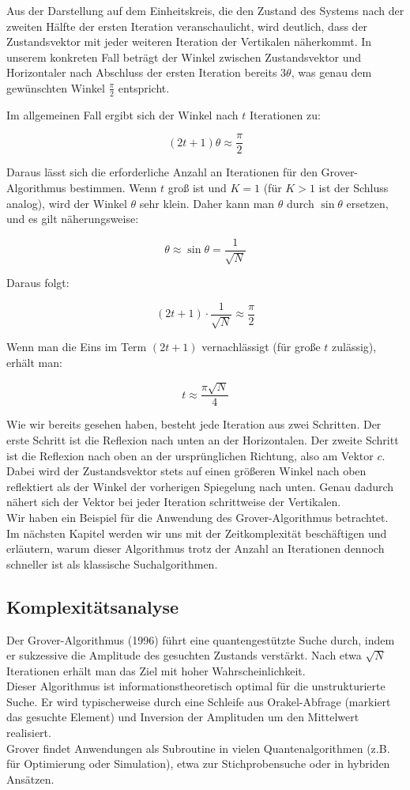 Aus der Darstellung auf dem Einheitskreis, die den Zustand des Systems nach der zweiten Hälfte der ersten Iteration veranschaulicht, wird deutlich, dass der Zustandsvektor mit jeder weiteren Iteration der Vertikalen näherkommt. In unserem konkreten Fall beträgt der Winkel zwischen Zustandsvektor und Horizontaler nach Abschluss der ersten Iteration bereits $3\theta$, was genau dem gewünschten Winkel $\frac{\pi}{2}$ entspricht.

Im allgemeinen Fall ergibt sich der Winkel nach $t$ Iterationen zu:

$$
(2t + 1)\theta \approx \frac{\pi}{2}
$$

Daraus lässt sich die erforderliche Anzahl an Iterationen für den Grover-Algorithmus bestimmen. Wenn $t$ groß ist und $K = 1$ (für $K > 1$ ist der Schluss analog), wird der Winkel $\theta$ sehr klein. Daher kann man $\theta$ durch $\sin{\theta}$ ersetzen, und es gilt näherungsweise:

$$
\theta \approx \sin{\theta} = \frac{1}{\sqrt{N}}
$$

Daraus folgt:

$$
(2t + 1) \cdot \frac{1}{\sqrt{N}} \approx \frac{\pi}{2}
$$

Wenn man die Eins im Term $(2t + 1)$ vernachlässigt (für große $t$ zulässig), erhält man:

$$
t \approx \frac{\pi \sqrt{N}}{4}
$$

Wie wir bereits gesehen haben, besteht jede Iteration aus zwei Schritten. Der erste Schritt ist die Reflexion nach unten an der Horizontalen. Der zweite Schritt ist die Reflexion nach oben an der ursprünglichen Richtung, also am Vektor $c$. Dabei wird der Zustandsvektor stets auf einen größeren Winkel nach oben reflektiert als der Winkel der vorherigen Spiegelung nach unten. Genau dadurch nähert sich der Vektor bei jeder Iteration schrittweise der Vertikalen.\\

Wir haben ein Beispiel für die Anwendung des Grover-Algorithmus betrachtet. Im nächsten Kapitel werden wir uns mit der Zeitkomplexität beschäftigen und erläutern, warum dieser Algorithmus trotz der Anzahl an Iterationen dennoch schneller ist als klassische Suchalgorithmen.


\subsection{Komplexitätsanalyse}
Der Grover-Algorithmus (1996) führt eine quantengestützte Suche durch, indem er sukzessive die Amplitude des gesuchten Zustands verstärkt. Nach etwa $\sqrt{N}$ Iterationen erhält man das Ziel mit hoher Wahrscheinlichkeit.\\
Dieser Algorithmus ist informationstheoretisch optimal für die unstrukturierte Suche. Er wird typischerweise durch eine Schleife aus Orakel-Abfrage (markiert das gesuchte Element) und Inversion der Amplituden um den Mittelwert realisiert.\\
Grover findet Anwendungen als Subroutine in vielen Quantenalgorithmen (z.B. für Optimierung oder Simulation), etwa zur Stichprobensuche oder in hybriden Ansätzen.

